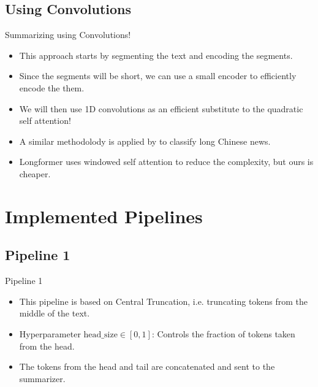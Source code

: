 \subsection{Using Convolutions}

\begin{frame}{Summarizing using Convolutions!}

\begin{itemize}
	\item This approach starts by segmenting the text and encoding the segments.
	\item<2-> Since the segments will be short, we can use a small encoder to efficiently
	encode the them.
	\item<3-> We will then use 1D convolutions as an efficient substitute to the
	quadratic self attention!
	\item<4-> A similar methodolody is applied by \citet{chen2022long} to classify long
	Chinese news.
	\item<5> Longformer \citep{beltagy2020longformer} uses windowed self attention to
	reduce the complexity, but ours is cheaper.
\end{itemize}
	
\end{frame}



\section{Implemented Pipelines}


\subsection{Pipeline 1}

\begin{frame}{Pipeline 1}

	\begin{itemize}
		\item This pipeline is based on Central Truncation, i.e. truncating
		tokens from the middle of the text.
		\item<2-> Hyperparameter $\mathrm{head\_size} \in [0, 1]$: Controls the fraction
		of tokens taken from the head.
		\item<3-> The tokens from the head and tail are concatenated and sent to the summarizer.
	\end{itemize}
	
\end{frame}
